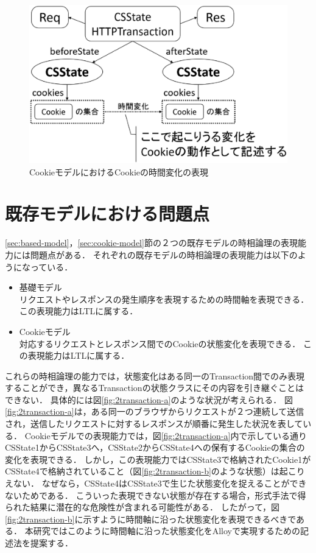 \documentclass[12pt,a4paper]{jbook}
\begin{document}
\begin{figure}[htb]
\centering
\includegraphics[width=350pt]{./fig/cookie-model-transaction.eps}
\caption{CookieモデルにおけるCookieの時間変化の表現}
\label{fig:cookie-model-transaction}
\end{figure}

\section{既存モデルにおける問題点}
\label{sec:existing-models-problems}
\ref{sec:based-model}，\ref{sec:cookie-model}節の２つの既存モデルの時相論理の表現能力には問題点がある．
それぞれの既存モデルの時相論理の表現能力は以下のようになっている．
\begin{itemize}
\item 基礎モデル \\
リクエストやレスポンスの発生順序を表現するための時間軸を表現できる．
この表現能力はLTLに属する．
\item Cookieモデル \\
対応するリクエストとレスポンス間でのCookieの状態変化を表現できる．
この表現能力はLTLに属する．
\end{itemize}
これらの時相論理の能力では，状態変化はある同一のTransaction間でのみ表現することができ，異なるTransactionの状態クラスにその内容を引き継ぐことはできない．
具体的には図\ref{fig:2transaction-a}のような状況が考えられる．
図\ref{fig:2transaction-a}は，ある同一のブラウザからリクエストが２つ連続して送信され，送信したリクエストに対するレスポンスが順番に発生した状況を表している．
Cookieモデルでの表現能力では，図\ref{fig:2transaction-a}内で示している通りCSState1からCSState3へ，CSState2からCSState4への保有するCookieの集合の変化を表現できる．
しかし，この表現能力ではCSState3で格納されたCookie1がCSState4で格納されていること（図\ref{fig:2transaction-b}のような状態）は起こりえない．
なぜなら，CSState4はCSState3で生じた状態変化を捉えることができないためである．
こういった表現できない状態が存在する場合，形式手法で得られた結果に潜在的な危険性が含まれる可能性がある．
したがって，図\ref{fig:2transaction-b}に示すように時間軸に沿った状態変化を表現できるべきである．
本研究ではこのように時間軸に沿った状態変化をAlloyで実現するための記述法を提案する．
\end{document}
